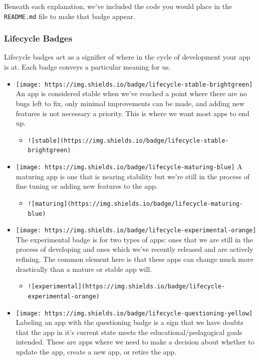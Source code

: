 \documentclass[
]{book}
\providecommand{\tightlist}{%
  \setlength{\itemsep}{0pt}\setlength{\parskip}{0pt}}
\begin{document}
Beneath each explanation, we've included the code you would place in the \texttt{README.md} file to make that badge appear.

\hypertarget{lifecycle-badges}{%
\subsubsection{Lifecycle Badges}\label{lifecycle-badges}}

Lifecycle badges act as a signifier of where in the cycle of development your app is at. Each badge conveys a particular meaning for us.

\begin{itemize}
\tightlist
\item
  \texttt{[image: https://img.shields.io/badge/lifecycle-stable-brightgreen]} An app is considered stable when we've reached a point where there are no bugs left to fix, only minimal improvements can be made, and adding new features is not necessary a priority. This is where we want most apps to end up.

  \begin{itemize}
  \tightlist
  \item
    \texttt{!{[}stable{]}(https://img.shields.io/badge/lifecycle-stable-brightgreen)}
  \end{itemize}
\item
  \texttt{[image: https://img.shields.io/badge/lifecycle-maturing-blue]} A maturing app is one that is nearing stability but we're still in the process of fine tuning or adding new features to the app.

  \begin{itemize}
  \tightlist
  \item
    \texttt{!{[}maturing{]}(https://img.shields.io/badge/lifecycle-maturing-blue)}
  \end{itemize}
\item
  \texttt{[image: https://img.shields.io/badge/lifecycle-experimental-orange]} The experimental badge is for two types of apps: ones that we are still in the process of developing and ones which we've recently released and are actively refining. The common element here is that these apps can change much more drastically than a mature or stable app will.

  \begin{itemize}
  \tightlist
  \item
    \texttt{!{[}experimental{]}(https://img.shields.io/badge/lifecycle-experimental-orange)}
  \end{itemize}
\item
  \texttt{[image: https://img.shields.io/badge/lifecycle-questioning-yellow]} Labeling an app with the questioning badge is a sign that we have doubts that the app in it's current state meets the educational/pedagogical goals intended. These are apps where we need to make a decision about whether to update the app, create a new app, or retire the app.


\end{itemize}
\end{document}

